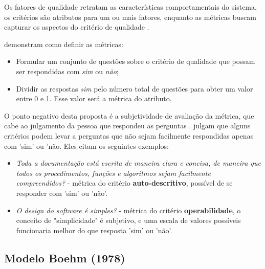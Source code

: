 \documentclass[
	12pt,				%
	openright,			%
	oneside,			%
	a4paper,			%
	english,			%
	brazil,				%
	]{abntex2}
\begin{document}
\begin{figure}[H]
    \label{fig:mcCall-quality_model}
\end{figure}

Os fatores de qualidade retratam as características comportamentais do sistema, os critérios são atributos para um ou mais fatores, enquanto as métricas buscam capturar os aspectos do critério de qualidade \cite{berander2005}.

 demonstram como definir as métricas:
\begin{itemize}
    \item Formular um conjunto de questões sobre o critério de qualidade que possam ser respondidas com \emph{sim} ou \emph{não};
    \item Dividir as respostas \emph{sim} pelo número total de questões para obter um valor entre 0 e 1. Esse valor será a métrica do atributo.
\end{itemize}

O ponto negativo desta proposta é a subjetividade de avaliação da métrica, que cabe ao julgamento da pessoa que respondeu as perguntas \cite{berander2005}.  julgam que alguns critérios podem levar a perguntas que não sejam facilmente respondidas apenas com 'sim' ou 'não. Eles citam os seguintes exemplos:
\begin{itemize}
    \item \emph{Toda a documentação está escrita de maneira clara e concisa, de maneira que todos os procedimentos, funções e algoritmos sejam facilmente compreendidos?} - métrica do critério \textbf{auto-descritivo}, possível de se responder com 'sim' ou 'não'.
    \item \emph{O design do software é simples?} - métrica do critério \textbf{operabilidade}, o conceito de "simplicidade" é subjetivo, e uma escala de valores possíveis funcionaria melhor do que resposta 'sim' ou 'não'.
\end{itemize}

\subsection{Modelo Boehm (1978)}
\end{document}
